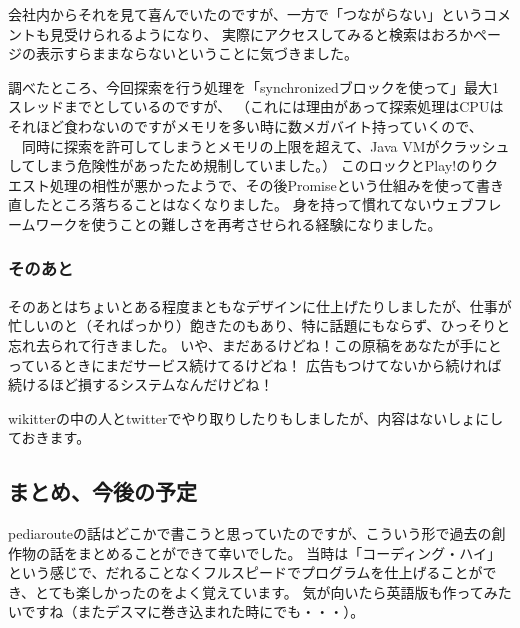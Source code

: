会社内からそれを見て喜んでいたのですが、一方で「つながらない」というコメントも見受けられるようになり、
実際にアクセスしてみると検索はおろかページの表示すらままならないということに気づきました。

調べたところ、今回探索を行う処理を「synchronizedブロックを使って」最大1スレッドまでとしているのですが、
（これには理由があって探索処理はCPUはそれほど食わないのですがメモリを多い時に数メガバイト持っていくので、
　同時に探索を許可してしまうとメモリの上限を超えて、Java VMがクラッシュしてしまう危険性があったため規制していました。）
このロックとPlay!のりクエスト処理の相性が悪かったようで、その後Promiseという仕組みを使って書き直したところ落ちることはなくなりました。
身を持って慣れてないウェブフレームワークを使うことの難しさを再考させられる経験になりました。

\subsubsection{そのあと}
そのあとはちょいとある程度まともなデザインに仕上げたりしましたが、仕事が忙しいのと（そればっかり）飽きたのもあり、特に話題にもならず、ひっそりと忘れ去られて行きました。
いや、まだあるけどね！この原稿をあなたが手にとっているときにまだサービス続けてるけどね！
広告もつけてないから続ければ続けるほど損するシステムなんだけどね！

wikitterの中の人とtwitterでやり取りしたりもしましたが、内容はないしょにしておきます。

\subsection{まとめ、今後の予定}
pediarouteの話はどこかで書こうと思っていたのですが、こういう形で過去の創作物の話をまとめることができて幸いでした。
当時は「コーディング・ハイ」という感じで、だれることなくフルスピードでプログラムを仕上げることができ、とても楽しかったのをよく覚えています。
気が向いたら英語版も作ってみたいですね（またデスマに巻き込まれた時にでも・・・）。
